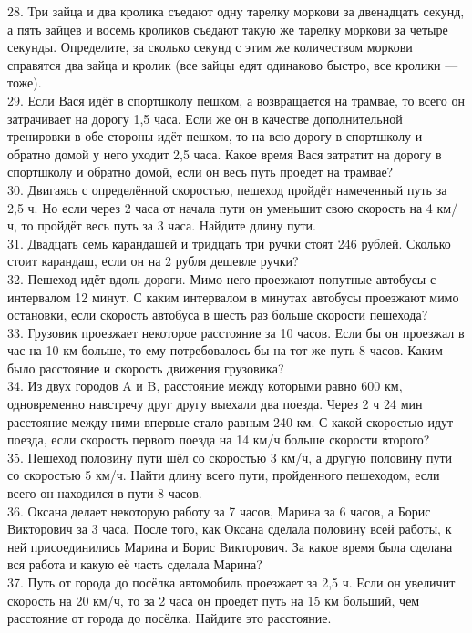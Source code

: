28. Три зайца и два кролика съедают одну тарелку моркови за двенадцать секунд, а пять зайцев и восемь кроликов съедают такую же тарелку моркови за четыре секунды. Определите, за сколько секунд с этим же количеством моркови справятся два зайца и кролик (все зайцы едят одинаково быстро, все кролики --- тоже).\\
29. Если Вася идёт в спортшколу пешком, а возвращается на трамвае, то всего он затрачивает на дорогу 1,5 часа. Если же он в качестве дополнительной тренировки в обе стороны идёт пешком, то на всю дорогу в спортшколу и обратно домой у него уходит 2,5 часа. Какое время Вася затратит на дорогу в спортшколу и обратно домой, если он весь путь проедет на трамвае?\\
30. Двигаясь с определённой скоростью, пешеход пройдёт намеченный путь за 2,5 ч. Но если через 2 часа от начала пути он уменьшит свою скорость на 4 км/ч, то пройдёт весь путь за 3 часа. Найдите длину пути.\\
31. Двадцать семь карандашей и тридцать три ручки стоят 246 рублей. Сколько стоит карандаш, если он на 2 рубля дешевле ручки?\\
32. Пешеход идёт вдоль дороги. Мимо него проезжают попутные автобусы с интервалом 12 минут. С каким интервалом в минутах автобусы проезжают мимо остановки, если скорость автобуса в шесть раз больше скорости пешехода?\\
33. Грузовик проезжает некоторое расстояние за 10 часов. Если бы он проезжал в час на 10 км больше, то ему потребовалось бы на тот же путь 8 часов. Каким было расстояние и скорость движения грузовика?\\
34. Из двух городов A и B, расстояние между которыми равно 600 км, одновременно навстречу друг другу выехали два поезда. Через 2 ч 24 мин расстояние между ними впервые стало равным 240 км. С какой скоростью идут поезда, если скорость первого поезда на 14 км/ч больше скорости второго?\\
35. Пешеход половину пути шёл со скоростью 3 км/ч, а другую половину пути со скоростью 5 км/ч. Найти длину всего пути, пройденного пешеходом, если всего он находился в пути 8 часов.\\
36. Оксана делает некоторую работу за 7 часов, Марина за 6 часов, а Борис Викторович за 3 часа. После того, как Оксана сделала половину всей работы, к ней присоединились Марина и Борис Викторович. За какое время была сделана вся работа и какую её часть сделала Марина?\\
37. Путь от города до посёлка автомобиль проезжает за 2,5 ч. Если он увеличит скорость на 20 км/ч, то за 2 часа он проедет путь на 15 км больший, чем расстояние от города до посёлка. Найдите это расстояние.\\
